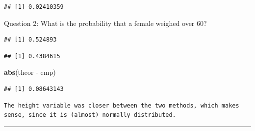 \documentclass[]{article}
\newenvironment{Shaded}{\begin{snugshade}}{\end{snugshade}}
\newcommand{\KeywordTok}[1]{\textcolor[rgb]{0.13,0.29,0.53}{\textbf{{#1}}}}
\newcommand{\DataTypeTok}[1]{\textcolor[rgb]{0.13,0.29,0.53}{{#1}}}
\newcommand{\DecValTok}[1]{\textcolor[rgb]{0.00,0.00,0.81}{{#1}}}
\newcommand{\StringTok}[1]{\textcolor[rgb]{0.31,0.60,0.02}{{#1}}}
\newcommand{\CommentTok}[1]{\textcolor[rgb]{0.56,0.35,0.01}{\textit{{#1}}}}
\newcommand{\NormalTok}[1]{{#1}}
\begin{document}
\begin{verbatim}
## [1] 0.02410359
\end{verbatim}

Question 2: What is the probability that a female weighed over 60?

\begin{Shaded}
\end{Shaded}

\begin{verbatim}
## [1] 0.524893
\end{verbatim}

\begin{Shaded}
\end{Shaded}

\begin{verbatim}
## [1] 0.4384615
\end{verbatim}

\begin{Shaded}
\begin{Highlighting}[]
\KeywordTok{abs}\NormalTok{(theor -}\StringTok{ }\NormalTok{emp)}
\end{Highlighting}
\end{Shaded}

\begin{verbatim}
## [1] 0.08643143
\end{verbatim}

\begin{verbatim}
The height variable was closer between the two methods, which makes sense, since it is (almost) normally distributed.
\end{verbatim}

\begin{center}\rule{0.5\linewidth}{\linethickness}\end{center}
\end{document}
